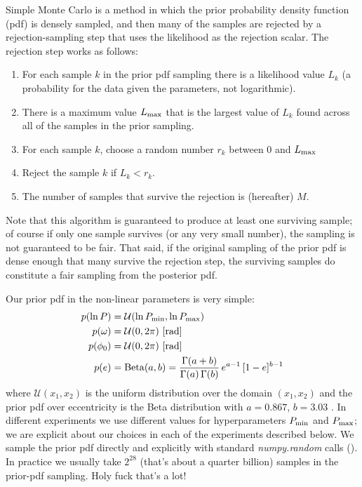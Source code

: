 \documentclass[manuscript, letterpaper]{aastex6}
\newcommand{\project}[1]{\textsl{#1}}
\begin{document}
Simple Monte Carlo is a method in which the prior probability density function
(pdf) is densely sampled, and then many of the samples are rejected by a
rejection-sampling step that uses the likelihood as the rejection scalar.
The rejection step works as follows:
\begin{enumerate}
\item For each sample $k$ in the prior pdf sampling there is a
  likelihood value $L_k$ (a probability for the data given the
  parameters, not logarithmic).
\item There is a maximum value $L_{\rm max}$ that is the largest value of
  $L_k$ found across all of the samples in the prior sampling.
\item For each sample $k$, choose a random number $r_k$ between 0 and
  $L_{\rm max}$
\item Reject the sample $k$ if $L_k < r_k$.
\item The number of samples that survive the rejection is (hereafter) $M$.
\end{enumerate}
Note that this algorithm is guaranteed to produce at least one
surviving sample; of course if only one sample survives (or any very
small number), the sampling is not guaranteed to be fair.
That said, if the original sampling of the prior pdf is dense enough
that many survive the rejection step, the surviving samples do
constitute a fair sampling from the posterior pdf.

Our prior pdf in the non-linear parameters is very simple:
\begin{align}
    p(\ln P) &= \mathcal{U}(\ln P_{\rm min}, \ln P_{\rm max})\\
    p(\omega) &= \mathcal{U}(0, 2\pi) ~ [{\rm rad}]\\
    p(\phi_0) &= \mathcal{U}(0, 2\pi) ~ [{\rm rad}]\\
    p(e) &= {\rm Beta}(a, b) = \frac{\Gamma(a+b)}{\Gamma(a) \, \Gamma(b)} \, e^{a-1} \, [1 - e]^{b-1}
\end{align}
where $\mathcal{U}(x_1, x_2)$ is the uniform distribution over the
domain $(x_1, x_2)$ and the prior pdf over eccentricity is the Beta
distribution with $a=0.867$, $b=3.03$ \citep{Kipping:2013}.
In different experiments we use different values for hyperparameters
$P_{\rm min}$ and $P_{\rm max}$; we are explicit about our choices in
each of the experiments described below.
We sample the prior pdf directly and explicitly with standard
\project{numpy.random} calls (\citealt{Van-der-Walt:2011}).
In practice we usually take $2^{28}$ (that's about a quarter billion)
samples in the prior-pdf sampling. Holy fuck that's a lot!
\end{document}
